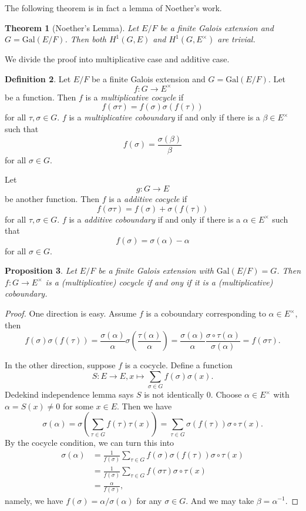\documentclass[12pt]{report}
\newtheorem{theorem}{Theorem}[section]
\newtheorem{proposition}[theorem]{Proposition}
{\theoremstyle{remark}\newtheorem*{remark}{Remark}}
\theoremstyle{definition}
\newtheorem{definition}[theorem]{Definition}
\newcommand{\Gal}{\text{Gal}}
\begin{document}
The following theorem is in fact a lemma of Noether's work.

\begin{theorem}[Noether's Lemma]
	Let $E/F$ be a finite Galois extension and $G=\Gal(E/F)$. Then both $H^1(G,E)$ and $H^1(G,E^\times)$ are trivial.
\end{theorem}

We divide the proof into multiplicative case and additive case.

\begin{definition}
	Let $E/F$ be a finite Galois extension and $G=\Gal(E/F)$. Let $$f: G\to E^\times$$ be a function. Then $f$ is a \emph{multiplicative cocycle} if $$f(\sigma\tau)=f(\sigma)\sigma(f(\tau))$$ for all $\tau,\sigma\in G$. $f$ is a \emph{multiplicative coboundary} if and only if there is a $\beta\in E^\times$ such that $$f(\sigma)=\frac{\sigma(\beta)}{\beta}$$ for all $\sigma\in G$.


	Let $$g: G\to E$$ be another function.  Then $f$ is a \emph{additive cocycle} if $$f(\sigma\tau)=f(\sigma)+\sigma(f(\tau))$$ for all $\tau,\sigma\in G$. $f$ is a \emph{additive coboundary} if and only if there is a $\alpha\in E^\times$ such that $$f(\sigma)=\sigma(\alpha) -\alpha$$ for all $\sigma\in G$.
\end{definition}

\begin{proposition}
	Let $E/F$ be a finite Galois extension with $\Gal(E/F)=G$. Then $f: G\to E^\times$ is a (multiplicative) cocycle if and ony if it is a (multiplicative) coboundary.
\end{proposition}

\begin{proof}
	One direction is easy. Assume $f$ is a coboundary corresponding to $\alpha\in E^\times$, then $$f(\sigma)\sigma(f(\tau))=\frac{\sigma(\alpha)}{\alpha}\sigma(\frac{\tau(\alpha)}{\alpha})=\frac{\sigma(\alpha)}{\alpha}\frac{\sigma\circ\tau(\alpha)}{\sigma(\alpha)}=f(\sigma\tau).$$

	In the other direction, suppose $f$ is a cocycle. Define a function $$S:E\to E,x\mapsto \sum_{\sigma\in G} f(\sigma)\sigma(x).$$ Dedekind independence lemma says $S$ is not identically 0. Choose $\alpha\in E^\times$ with $\alpha=S(x)\not= 0$ for some $x\in E$. Then we have $$\sigma(\alpha)=\sigma(\sum_{\tau\in G} f(\tau)\tau(x))=\sum_{\tau \in G} \sigma(f(\tau)) \sigma\circ\tau(x).$$
	By the cocycle condition, we can turn this into
	\begin{align*}
		\sigma(\alpha) & = \frac{1}{f(\sigma)}\sum_{\tau \in G} f(\sigma)\sigma(f(\tau)) \sigma\circ\tau(x) \\
		               & =\frac{1}{f(\sigma)} \sum_{\tau \in G} f(\sigma\tau) \sigma\circ\tau(x)            \\
		               & =\frac{\alpha}{f(\sigma)},
	\end{align*}
	namely, we have $f(\sigma)=\alpha/\sigma(\alpha)$ for any $\sigma\in G$. And we may take $\beta=\alpha^{-1}$.
\end{proof}
\end{document}
